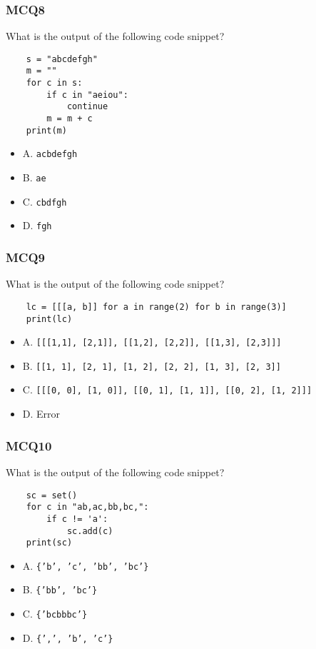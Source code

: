 \documentclass{beamer}
\begin{document}
\begin{frame}[fragile]
    \frametitle{MCQ8}
    What is the output of the following code snippet?
    \begin{verbatim}
    s = "abcdefgh"
    m = ""
    for c in s:
        if c in "aeiou":
            continue
        m = m + c
    print(m)
    \end{verbatim}
    \begin{itemize}
        \item A. \texttt{acbdefgh}
        \item B. \texttt{ae}
        \item C. \texttt{cbdfgh}
        \item D. \texttt{fgh}
    \end{itemize}
\end{frame}

\begin{frame}[fragile]
    \frametitle{MCQ9}
    What is the output of the following code snippet?
    \begin{verbatim}
    lc = [[[a, b]] for a in range(2) for b in range(3)]
    print(lc)
    \end{verbatim}
    \begin{itemize}
        \small
        \item A. \texttt{[[[1,1], [2,1]], [[1,2], [2,2]], [[1,3], [2,3]]]}
        \item B. \texttt{[[1, 1], [2, 1], [1, 2], [2, 2], [1, 3], [2, 3]]}
        \item C. \texttt{[[[0, 0], [1, 0]], [[0, 1], [1, 1]], [[0, 2], [1, 2]]]}
        \item D. Error
    \end{itemize}
\end{frame}

\begin{frame}[fragile]
    \frametitle{MCQ10}
    What is the output of the following code snippet?
    \begin{verbatim}
    sc = set()
    for c in "ab,ac,bb,bc,":
        if c != 'a':
            sc.add(c)
    print(sc)
    \end{verbatim}
    \begin{itemize}
        \item A. \texttt{\{'b', 'c', 'bb', 'bc'\}}
        \item B. \texttt{\{'bb', 'bc'\}}
        \item C. \texttt{\{'bcbbbc'\}}
        \item D. \texttt{\{',', 'b', 'c'\}}
    \end{itemize}
\end{frame}
\end{document}
